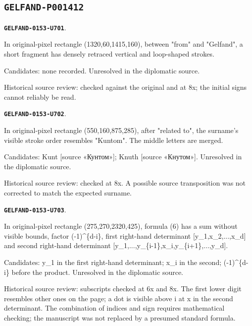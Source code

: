 \documentclass[11pt]{article}
\theoremstyle{definition}
\theoremstyle{remark}
\begin{document}
\subsection*{\texttt{GELFAND-P001412}}
\par\noindent\leavevmode{}\label{GELFAND-0153-U701}\label{GELFAND-P001412:top-cancelled:note}\textbf{\texttt{GELFAND-0153-U701}}.\nopagebreak[4]\par
In original-pixel rectangle (1320,60,1415,160), between "from" and "Gelfand", a short fragment has densely retraced vertical and loop-shaped strokes.\par
Candidates: none recorded. Unresolved in the diplomatic source.\par
Historical source review: checked against the original and at 8x; the initial signs cannot reliably be read.\par\medskip
\par\noindent\leavevmode{}\label{GELFAND-0153-U702}\label{GELFAND-P001412:knuth-name:note}\textbf{\texttt{GELFAND-0153-U702}}.\nopagebreak[4]\par
In original-pixel rectangle (550,160,875,285), after "related to", the surname's visible stroke order resembles "Kuntom". The middle letters are merged.\par
Candidates: Kunt [source «Кунтом»]; Knuth [source «Кнутом»]. Unresolved in the diplomatic source.\par
Historical source review: checked at 8x. A possible source transposition was not corrected to match the expected surname.\par\medskip
\par\noindent\leavevmode{}\label{GELFAND-0153-U703}\label{GELFAND-P001412:determinant-formula-source:note}\textbf{\texttt{GELFAND-0153-U703}}.\nopagebreak[4]\par
In original-pixel rectangle (275,270,2320,425), formula (6) has a sum without visible bounds, factor (-1)\textasciicircum{}\{d-i\}, first right-hand determinant [y\_1,x\_2,...,x\_d] and second right-hand determinant [y\_1,...,y\_\{i-1\},x\_i,y\_\{i+1\},...,y\_d].\par
Candidates: y\_1 in the first right-hand determinant; x\_i in the second; (-1)\textasciicircum{}\{d-i\} before the product. Unresolved in the diplomatic source.\par
Historical source review: subscripts checked at 6x and 8x. The first lower digit resembles other ones on the page; a dot is visible above i at x in the second determinant. The combination of indices and sign requires mathematical checking; the manuscript was not replaced by a presumed standard formula.\par\medskip
\end{document}
